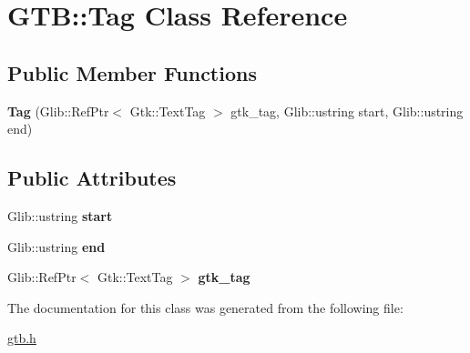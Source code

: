 \hypertarget{a00028}{}\section{G\+TB\+:\+:Tag Class Reference}
\label{a00028}
\subsection*{Public Member Functions}
\begin{DoxyCompactItemize}
\item 
\mbox{\label{a00028_a44ec480d3984b0512f73ec7d903413ba}} 
{\bfseries Tag} (Glib\+::\+Ref\+Ptr$<$ Gtk\+::\+Text\+Tag $>$ gtk\+\_\+tag, Glib\+::ustring start, Glib\+::ustring end)
\end{DoxyCompactItemize}
\subsection*{Public Attributes}
\begin{DoxyCompactItemize}
\item 
\mbox{\label{a00028_aafe562cb9697e0e3a40a72d8aa611722}} 
Glib\+::ustring {\bfseries start}
\item 
\mbox{\label{a00028_af357ad77aaa6db454030290f1e05f41f}} 
Glib\+::ustring {\bfseries end}
\item 
\mbox{\label{a00028_aa06115e8641dfecc4f7e8ca343bbfe57}} 
Glib\+::\+Ref\+Ptr$<$ Gtk\+::\+Text\+Tag $>$ {\bfseries gtk\+\_\+tag}
\end{DoxyCompactItemize}


The documentation for this class was generated from the following file\+:\begin{DoxyCompactItemize}
\item 
\hyperlink{a00005}{gtb.\+h}\end{DoxyCompactItemize}
